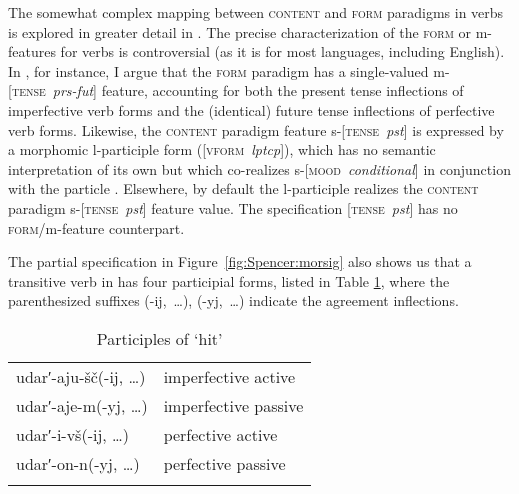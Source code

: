 \documentclass[output=paper]{langsci/langscibook}
\begin{document}
\begin{sloppypar}The somewhat complex mapping between \textsc{content} and \textsc{form} paradigms in  verbs is explored in greater detail in %
\citet{Spencer17:Russptcps}%
%
. The precise characterization of the \textsc{form} or m-features for  verbs is controversial (as it is for most languages, including English). In %
\citet{Spencer17:Russptcps}%
%
, for instance, I argue that the  \textsc{form} paradigm has a single-valued m-[\textsc{tense}~\textit{prs-fut}] feature, accounting for both the present tense inflections of imperfective verb forms and the (identical) future tense inflections of perfective verb forms. Likewise,  the  \textsc{content} paradigm feature s-[\textsc{tense}~\textit{pst}] is expressed by a morphomic l-participle form ([\textsc{vform}~\textit{lptcp}]), which has no semantic interpretation of its own but which co-realizes s-[\textsc{mood}~\textit{conditional}] in conjunction with the particle . Elsewhere, by default the l-participle realizes the  \textsc{content} paradigm \mbox{s-[\textsc{tense}~\textit{pst}]} feature value. The  specification  [\textsc{tense}~\textit{pst}] has no \textsc{form}/m-feature counterpart.\end{sloppypar}

The partial specification in Figure~\ref{fig:Spencer:morsig} also shows us that a transitive verb in  has four participial forms, listed in Table \ref{tab:Spencer:russptcps}, where the parenthesized suffixes \mbox{(-ij, \ldots{}),} \mbox{(-yj, \ldots{})} indicate the agreement inflections.

\begin{table}
\begin{tabular}{ll}\lsptoprule
udarʹ-aju-šč(-ij, \ldots{})	&imperfective active	\\
udarʹ-aje-m(-yj, \ldots{})	&imperfective passive	\\
udarʹ-i-vš(-ij, \ldots{})	&perfective active	\\
udarʹ-on-n(-yj, \ldots{})	&perfective passive	\\ \lspbottomrule

\end{tabular}
\caption{Participles of   `hit'} \label{tab:Spencer:russptcps}
\end{table}
\end{document}
